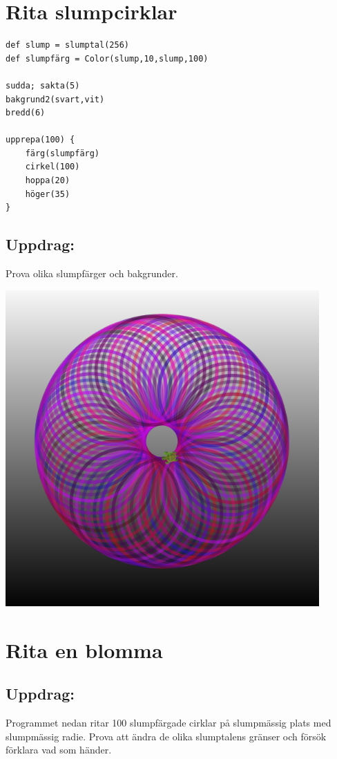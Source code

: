 \chapter{Rita slumpcirklar}
\begin{multicols}{2}

\begin{lstlisting}[basicstyle={\ttfamily\fontsize{16}{19}\selectfont},numbers=none]
def slump = slumptal(256)
def slumpfärg = Color(slump,10,slump,100) 

sudda; sakta(5)
bakgrund2(svart,vit)
bredd(6)

upprepa(100) {
    färg(slumpfärg)
    cirkel(100)
    hoppa(20)
    höger(35)
}
\end{lstlisting}
        
\section*{\color{BrickRed}Uppdrag:}
Prova olika slumpfärger och bakgrunder.


\columnbreak


\begin{center}
\includegraphics[width=12.0cm]{../img/circle-of-circles.png}
\end{center}

\end{multicols}

\chapter{Rita en blomma}\section*{\color{BrickRed}Uppdrag:}
Programmet nedan ritar 100 slumpfärgade cirklar på slumpmässig plats med slumpmässig radie. Prova att ändra de olika slumptalens gränser och försök förklara vad som händer.

